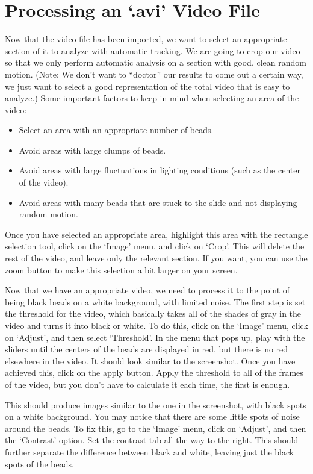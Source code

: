 \section*{Processing an `.avi' Video File}
Now that the video file has been imported, we want to select an appropriate section of it to analyze with automatic tracking. 
We are going to crop our video so that we only perform automatic analysis on a section with good, clean random motion. 
(Note: We don’t want to ``doctor'' our results to come out a certain way, we just want to select a good representation of the total video that is easy to analyze.) 
Some important factors to keep in mind when selecting an area of the video:
\begin{itemize}
\item Select an area with an appropriate number of beads.
\item Avoid areas with large clumps of beads.
\item Avoid areas with large fluctuations in lighting conditions (such as the center of the video).
\item Avoid areas with many beads that are stuck to the slide and not displaying random motion.
\end{itemize}
Once you have selected an appropriate area, highlight this area with the rectangle selection tool, click on the `Image' menu, and click on `Crop'. 
This will delete the rest of the video, and leave only the relevant section. 
If you want, you can use the zoom button to make this selection a bit larger on your screen.
\par 
Now that we have an appropriate video, we need to process it to the point of being black beads on a white background, with limited noise. 
The first step is set the threshold for the video, which basically takes all of the shades of gray in the video and turns it into black or white. 
To do this, click on the `Image' menu, click on `Adjust', and then select `Threshold'. 
In the menu that pops up, play with the sliders until the centers of the beads are displayed in red, but there is no red elsewhere in the video. 
It should look similar to the screenshot. 
Once you have achieved this, click on the apply button. 
Apply the threshold to all of the frames of the video, but you don't have to calculate it each time, the first is enough.
\par 
This should produce images similar to the one in the screenshot, with black spots on a white background. 
You may notice that there are some little spots of noise around the beads. 
To fix this, go to the `Image' menu, click on `Adjust', and then the `Contrast' option. 
Set the contrast tab all the way to the right. 
This should further separate the difference between black and white, leaving just the black spots of the beads.

